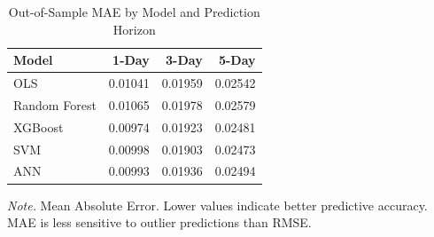 \begin{table}[!ht]
\centering
\begin{threeparttable}
\caption{Out-of-Sample MAE by Model and Prediction Horizon}
\label{tab:eval_mae}

\begin{tabular}{lrrr}
\toprule
Model & 1-Day & 3-Day & 5-Day\\
\midrule
OLS & 0.01041 & 0.01959 & 0.02542\\
Random Forest & 0.01065 & 0.01978 & 0.02579\\
XGBoost & 0.00974 & 0.01923 & 0.02481\\
SVM & 0.00998 & 0.01903 & 0.02473\\
ANN & 0.00993 & 0.01936 & 0.02494\\
\bottomrule
\end{tabular}
\begin{tablenotes}
\footnotesize
\item \textit{Note.} Mean Absolute Error. Lower values indicate better predictive accuracy. MAE is less sensitive to outlier predictions than RMSE.
\end{tablenotes}
\end{threeparttable}
\end{table}
